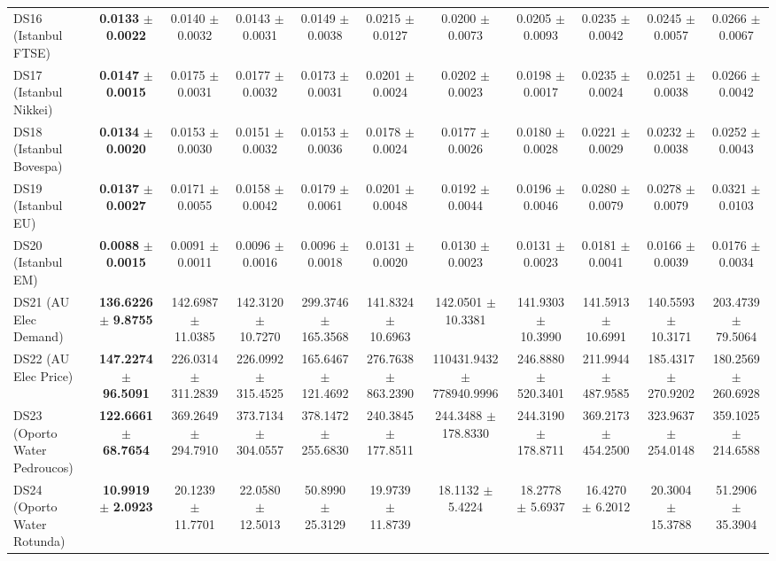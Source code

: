 \begin{table}[t]
{{\begin{tabular}{lcccccccccc}
DS16 (Istanbul FTSE) & \textbf{0.0133} $\pm$ \textbf{0.0022} & 0.0140 $\pm$ 0.0032 & 0.0143 $\pm$ 0.0031 & 0.0149 $\pm$ 0.0038 & 0.0215 $\pm$ 0.0127 & 0.0200 $\pm$ 0.0073 & 0.0205 $\pm$ 0.0093 & 0.0235 $\pm$ 0.0042 & 0.0245 $\pm$ 0.0057 & 0.0266 $\pm$ 0.0067 \\
DS17 (Istanbul Nikkei) & \textbf{0.0147} $\pm$ \textbf{0.0015} & 0.0175 $\pm$ 0.0031 & 0.0177 $\pm$ 0.0032 & 0.0173 $\pm$ 0.0031 & 0.0201 $\pm$ 0.0024 & 0.0202 $\pm$ 0.0023 & 0.0198 $\pm$ 0.0017 & 0.0235 $\pm$ 0.0024 & 0.0251 $\pm$ 0.0038 & 0.0266 $\pm$ 0.0042 \\
DS18 (Istanbul Bovespa) & \textbf{0.0134} $\pm$ \textbf{0.0020} & 0.0153 $\pm$ 0.0030 & 0.0151 $\pm$ 0.0032 & 0.0153 $\pm$ 0.0036 & 0.0178 $\pm$ 0.0024 & 0.0177 $\pm$ 0.0026 & 0.0180 $\pm$ 0.0028 & 0.0221 $\pm$ 0.0029 & 0.0232 $\pm$ 0.0038 & 0.0252 $\pm$ 0.0043 \\
DS19 (Istanbul EU) & \textbf{0.0137} $\pm$ \textbf{0.0027} & 0.0171 $\pm$ 0.0055 & 0.0158 $\pm$ 0.0042 & 0.0179 $\pm$ 0.0061 & 0.0201 $\pm$ 0.0048 & 0.0192 $\pm$ 0.0044 & 0.0196 $\pm$ 0.0046 & 0.0280 $\pm$ 0.0079 & 0.0278 $\pm$ 0.0079 & 0.0321 $\pm$ 0.0103 \\
DS20 (Istanbul EM) & \textbf{0.0088} $\pm$ \textbf{0.0015} & 0.0091 $\pm$ 0.0011 & 0.0096 $\pm$ 0.0016 & 0.0096 $\pm$ 0.0018 & 0.0131 $\pm$ 0.0020 & 0.0130 $\pm$ 0.0023 & 0.0131 $\pm$ 0.0023 & 0.0181 $\pm$ 0.0041 & 0.0166 $\pm$ 0.0039 & 0.0176 $\pm$ 0.0034 \\
DS21 (AU Elec Demand) & \textbf{136.6226} $\pm$ \textbf{9.8755} & 142.6987 $\pm$ 11.0385 & 142.3120 $\pm$ 10.7270 & 299.3746 $\pm$ 165.3568 & 141.8324 $\pm$ 10.6963 & 142.0501 $\pm$ 10.3381 & 141.9303 $\pm$ 10.3990 & 141.5913 $\pm$ 10.6991 & 140.5593 $\pm$ 10.3171 & 203.4739 $\pm$ 79.5064 \\
DS22 (AU Elec Price) & \textbf{147.2274} $\pm$ \textbf{96.5091} & 226.0314 $\pm$ 311.2839 & 226.0992 $\pm$ 315.4525 & 165.6467 $\pm$ 121.4692 & 276.7638 $\pm$ 863.2390 & 110431.9432 $\pm$ 778940.9996 & 246.8880 $\pm$ 520.3401 & 211.9944 $\pm$ 487.9585 & 185.4317 $\pm$ 270.9202 & 180.2569 $\pm$ 260.6928 \\
DS23 (Oporto Water Pedroucos) & \textbf{122.6661} $\pm$ \textbf{68.7654} & 369.2649 $\pm$ 294.7910 & 373.7134 $\pm$ 304.0557 & 378.1472 $\pm$ 255.6830 & 240.3845 $\pm$ 177.8511 & 244.3488 $\pm$ 178.8330 & 244.3190 $\pm$ 178.8711 & 369.2173 $\pm$ 454.2500 & 323.9637 $\pm$ 254.0148 & 359.1025 $\pm$ 214.6588 \\
DS24 (Oporto Water Rotunda) & \textbf{10.9919} $\pm$ \textbf{2.0923} & 20.1239 $\pm$ 11.7701 & 22.0580 $\pm$ 12.5013 & 50.8990 $\pm$ 25.3129 & 19.9739 $\pm$ 11.8739 & 18.1132 $\pm$ 5.4224 & 18.2778 $\pm$ 5.6937 & 16.4270 $\pm$ 6.2012 & 20.3004 $\pm$ 15.3788 & 51.2906 $\pm$ 35.3904 \\
\bottomrule
\end{tabular}%
}%
}
\end{table}
